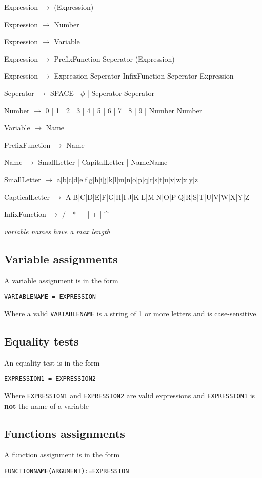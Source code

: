 \documentclass[11pt,a4paper]{article}
\begin{document}
Expression \(\rightarrow\) (Expression)

Expression \(\rightarrow\) Number

Expression \(\rightarrow\) Variable

Expression \(\rightarrow\) PrefixFunction Seperator (Expression)

Expression \(\rightarrow\) Expression Seperator InfixFunction Seperator Expression

Seperator \(\rightarrow\) SPACE | \(\phi\) | Seperator Seperator

Number \(\rightarrow\) 0 | 1 | 2 | 3 | 4 | 5 | 6 | 7 | 8 | 9 | Number Number

Variable \(\rightarrow\) Name

PrefixFunction \(\rightarrow\) Name

Name \(\rightarrow\) SmallLetter | CapitalLetter | NameName

SmallLetter \(\rightarrow\) a|b|c|d|e|f|g|h|i|j|k|l|m|n|o|p|q|r|s|t|u|v|w|x|y|z

CapticalLetter \(\rightarrow\) A|B|C|D|E|F|G|H|I|J|K|L|M|N|O|P|Q|R|S|T|U|V|W|X|Y|Z

InfixFunction \(\rightarrow\) / | * | - | + | \^{}

\emph{variable names have a max length}


\subsection{Variable assignments}
A variable assignment is in the form

\texttt{VARIABLENAME = EXPRESSION}

Where a valid \texttt{VARIABLENAME} is a string of 1 or more letters and
is case-sensitive.
\subsection{Equality tests}
An equality test is in the form

\texttt{EXPRESSION1 = EXPRESSION2}

Where \texttt{EXPRESSION1} and \texttt{EXPRESSION2} are valid expressions and
\texttt{EXPRESSION1} is \textbf{not} the name of a variable

\subsection{Functions assignments}
A function assignment is in the form

\texttt{FUNCTIONNAME(ARGUMENT):=EXPRESSION}
\end{document}
